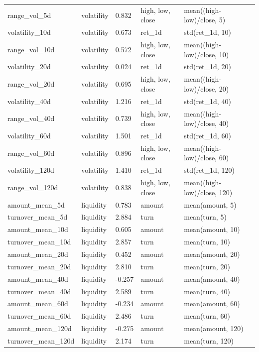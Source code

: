 \begin{longtable}{p{}p{}p{}p{}p{}}
range\_vol\_5d & volatility & 0.832 & high, low, close & mean((high-low)/close, 5) \\
volatility\_10d & volatility & 0.673 & ret\_1d & std(ret\_1d, 10) \\
range\_vol\_10d & volatility & 0.572 & high, low, close & mean((high-low)/close, 10) \\
volatility\_20d & volatility & 0.024 & ret\_1d & std(ret\_1d, 20) \\
range\_vol\_20d & volatility & 0.695 & high, low, close & mean((high-low)/close, 20) \\
volatility\_40d & volatility & 1.216 & ret\_1d & std(ret\_1d, 40) \\
range\_vol\_40d & volatility & 0.739 & high, low, close & mean((high-low)/close, 40) \\
volatility\_60d & volatility & 1.501 & ret\_1d & std(ret\_1d, 60) \\
range\_vol\_60d & volatility & 0.896 & high, low, close & mean((high-low)/close, 60) \\
volatility\_120d & volatility & 1.410 & ret\_1d & std(ret\_1d, 120) \\
range\_vol\_120d & volatility & 0.838 & high, low, close & mean((high-low)/close, 120) \\
amount\_mean\_5d & liquidity & 0.783 & amount & mean(amount, 5) \\
turnover\_mean\_5d & liquidity & 2.884 & turn & mean(turn, 5) \\
amount\_mean\_10d & liquidity & 0.605 & amount & mean(amount, 10) \\
turnover\_mean\_10d & liquidity & 2.857 & turn & mean(turn, 10) \\
amount\_mean\_20d & liquidity & 0.452 & amount & mean(amount, 20) \\
turnover\_mean\_20d & liquidity & 2.810 & turn & mean(turn, 20) \\
amount\_mean\_40d & liquidity & -0.257 & amount & mean(amount, 40) \\
turnover\_mean\_40d & liquidity & 2.589 & turn & mean(turn, 40) \\
amount\_mean\_60d & liquidity & -0.234 & amount & mean(amount, 60) \\
turnover\_mean\_60d & liquidity & 2.486 & turn & mean(turn, 60) \\
amount\_mean\_120d & liquidity & -0.275 & amount & mean(amount, 120) \\
turnover\_mean\_120d & liquidity & 2.174 & turn & mean(turn, 120) \\

\end{longtable}
